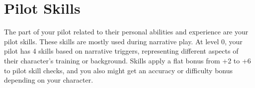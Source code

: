 \section{Pilot Skills}

The part of your pilot related to their personal abilities and experience are your pilot skills. These
skills are mostly used during narrative play. At level 0, your pilot has 4 skills based on narrative
triggers, representing different aspects of their character's training or background. Skills apply a
flat bonus from +2 to +6 to pilot skill checks, and you also might get an accuracy or difficulty
bonus depending on your character.